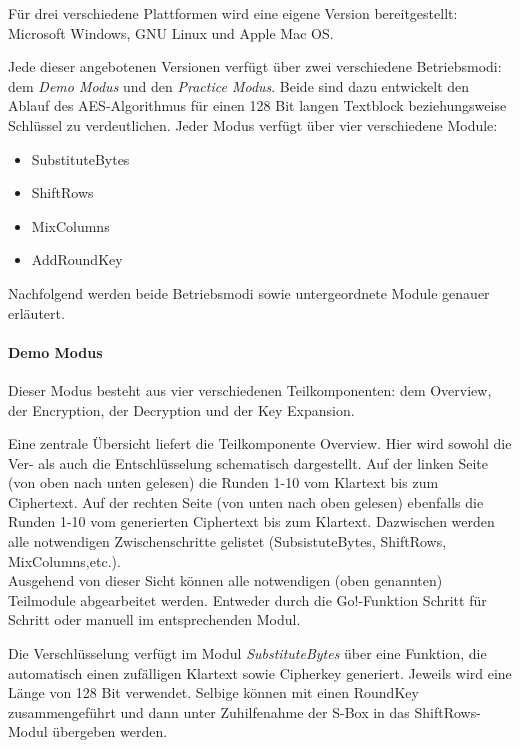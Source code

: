    Für drei verschiedene Plattformen wird eine eigene Version bereitgestellt:
   Microsoft Windows, GNU Linux und Apple Mac OS.

   Jede dieser angebotenen Versionen verfügt über zwei verschiedene Betriebsmodi: dem \textit{Demo Modus}
   und den \textit{Practice Modus}. Beide sind dazu entwickelt den Ablauf des AES-Algorithmus für
   einen 128 Bit langen Textblock beziehungsweise Schlüssel zu verdeutlichen\cite{michiganuni}.
   Jeder Modus verfügt über vier verschiedene Module:

   \begin{itemize}
      \item SubstituteBytes
      \item ShiftRows
      \item MixColumns
      \item AddRoundKey
   \end{itemize}

   Nachfolgend werden beide Betriebsmodi sowie untergeordnete Module genauer erläutert.

   \paragraph{Demo Modus}
   Dieser Modus besteht aus vier verschiedenen Teilkomponenten: dem Overview, der Encryption,
   der Decryption und der Key Expansion.

   Eine zentrale Übersicht liefert die Teilkomponente Overview. Hier wird sowohl die Ver- als auch die
   Entschlüsselung schematisch dargestellt. Auf der linken Seite (von oben nach unten gelesen) die
   Runden 1-10 vom Klartext bis zum Ciphertext. Auf der rechten Seite (von unten nach oben gelesen)
   ebenfalls die Runden 1-10 vom generierten Ciphertext bis zum Klartext. Dazwischen werden alle
   notwendigen Zwischenschritte gelistet (SubsistuteBytes, ShiftRows, MixColumns,etc.). \\
   Ausgehend von dieser Sicht können alle notwendigen (oben genannten) Teilmodule abgearbeitet werden.
   Entweder durch die Go!-Funktion Schritt für Schritt oder manuell im entsprechenden Modul.

   Die Verschlüsselung verfügt im Modul \textit{SubstituteBytes} über eine Funktion,
   die automatisch einen zufälligen Klartext sowie
   Cipherkey generiert. Jeweils wird eine Länge von 128 Bit verwendet.
   Selbige können mit einen RoundKey zusammengeführt und dann unter Zuhilfenahme
   der S-Box in das ShiftRows-Modul übergeben werden.

